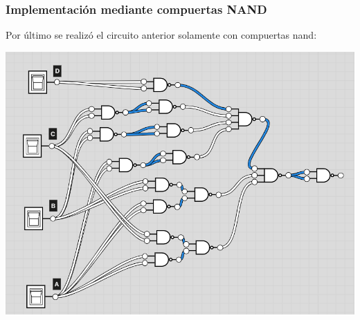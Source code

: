 \subsubsection{Implementación mediante compuertas NAND}
Por último se realizó el circuito anterior solamente con compuertas nand:

\includegraphics{Ejercicio_2/circuitos/Ej2_parte2_nand_logicly.png}

%